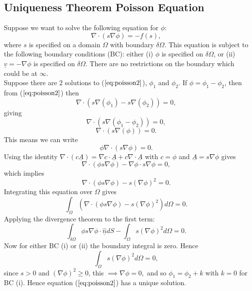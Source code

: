 \documentclass[11pt]{article}
\newcommand{\ul}{\underline}
\begin{document}
\begin{appendices}
\section{Uniqueness Theorem Poisson Equation}
\label{appendix:poisson}
Suppose we want to solve the following equation for $\phi$:
\begin{equation}
\label{eq:poisson2}
\nabla\cdot(s\nabla{\phi}) = -f(s),
\end{equation}
where $s$ is specified on a domain $\Omega$ with boundary $\delta{\Omega}$. This equation is subject to the following boundary conditions (BC):
either (i) $\phi$ is specified on $\delta{\Omega}$, or (ii) $\ul{v} = -\nabla{\phi}$ is specified on $\delta{\Omega}$.
There are no restrictions on the boundary which could be at $\infty$.\\
Suppose there are 2 solutions to ($\ref{eq:poisson2}$), $\phi_1$ and $\phi_2.$
If $\phi = \phi_1-\phi_2$, then from ($\ref{eq:poisson2}$)
then
$$\nabla\cdot(s\nabla(\phi_1)-s\nabla(\phi_2)) = 0,$$
giving $$\nabla\cdot(s\nabla(\phi_1-\phi_2)) = 0,$$
$$\nabla\cdot(s\nabla(\phi)) = 0.$$
This means we can write 
$$\phi\nabla\cdot(s\nabla{\phi}) = 0.$$
Using the identity $\nabla\cdot(c\ul{A}) = \nabla{c}\cdot\ul{A} + c\nabla\cdot{\ul{A}}$ with $c = \phi$ and $\ul{A} = s\nabla{\phi}$ gives
$$ \nabla\cdot( \phi{s}\nabla\phi ) - \nabla\phi\cdot{s}\nabla\phi = 0,$$
which implies
$$ \nabla\cdot( \phi{s}\nabla\phi ) - s(\nabla\phi)^2 = 0.$$
Integrating this equation over $\Omega$ gives
$$ \int_{\Omega}(\nabla\cdot( \phi{s}\nabla\phi ) - s(\nabla\phi)^2)d\Omega=0.$$ 
Applying the divergence theorem to the first term:
$$ \int_{\delta{\Omega}}\phi{s}\nabla{\phi}\cdot\ul{\hat{n}}dS - \int_{\Omega}s(\nabla\phi)^2d\Omega=0.$$
Now for either BC (i) or (ii) the boundary integral is zero. Hence
$$ \int_{\Omega}s(\nabla\phi)^2d\Omega=0,$$ 
since $s>0$ and $(\nabla\phi)^2\geq 0$, this $\implies \nabla{\phi} = 0,$ and so $\phi_1 = \phi_2 + k$ with $k = 0$ for BC (i). Hence equation ($\ref{eq:poisson2}$) has a unique solution. 
\end{appendices}


\end{document}
